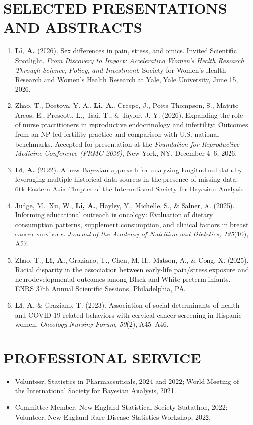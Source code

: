 \documentclass[letterpaper,11pt]{article}
\newcommand{\resumeItem}[1]{
  \item\small{
    {#1 \vspace{-1pt}}
  }
}
\newcommand{\resumeItemListStart}{\begin{itemize}[leftmargin=0.1in]}
\newcommand{\resumeItemListEnd}{\end{itemize}\vspace{-5pt}}
\newcommand{\publicationListStart}{%
  \begin{enumerate}[
    leftmargin=0.30in,
    labelsep=0.08in,
    itemsep=5pt,
    topsep=5pt,
    parsep=0pt,
    partopsep=0pt
  ]%
}
\newcommand{\publicationListEnd}{\end{enumerate}}
\newcommand{\publicationItem}[1]{\item \normalsize{#1}}
\begin{document}
\section{SELECTED PRESENTATIONS AND ABSTRACTS}
\publicationListStart
  \publicationItem{\textbf{Li, A.} (2026). Sex differences in pain, stress, and omics. Invited Scientific Spotlight, \textit{From Discovery to Impact: Accelerating Women's Health Research Through Science, Policy, and Investment}, Society for Women's Health Research and Women's Health Research at Yale, Yale University, June 15, 2026.}
  \publicationItem{Zhao, T., Dostova, Y. A., \textbf{Li, A.}, Crespo, J., Potts-Thompson, S., Matute-Arcos, E., Prescott, L., Tsai, T., \& Taylor, J. Y. (2026). Expanding the role of nurse practitioners in reproductive endocrinology and infertility: Outcomes from an NP-led fertility practice and comparison with U.S. national benchmarks. Accepted for presentation at the \textit{Foundation for Reproductive Medicine Conference (FRMC 2026)}, New York, NY, December 4--6, 2026.}
  \publicationItem{\textbf{Li, A.} (2022). A new Bayesian approach for analyzing longitudinal data by leveraging multiple historical data sources in the presence of missing data. 6th Eastern Asia Chapter of the International Society for Bayesian Analysis.}
  \publicationItem{Judge, M., Xu, W., \textbf{Li, A.}, Hayley, Y., Michelle, S., \& Salner, A. (2025). Informing educational outreach in oncology: Evaluation of dietary consumption patterns, supplement consumption, and clinical factors in breast cancer survivors. \textit{Journal of the Academy of Nutrition and Dietetics, 125}(10), A27.}
  \publicationItem{Zhao, T., \textbf{Li, A.}, Graziano, T., Chen, M. H., Matson, A., \& Cong, X. (2025). Racial disparity in the association between early-life pain/stress exposure and neurodevelopmental outcomes among Black and White preterm infants. ENRS 37th Annual Scientific Sessions, Philadelphia, PA.}
  \publicationItem{\textbf{Li, A.} \& Graziano, T. (2023). Association of social determinants of health and COVID-19-related behaviors with cervical cancer screening in Hispanic women. \textit{Oncology Nursing Forum, 50}(2), A45--A46.}
\publicationListEnd

\section{PROFESSIONAL SERVICE}
\resumeItemListStart
  \resumeItem{\normalsize{Volunteer, Statistics in Pharmaceuticals, 2024 and 2022; World Meeting of the International Society for Bayesian Analysis, 2021.}}
  \resumeItem{\normalsize{Committee Member, New England Statistical Society Statathon, 2022; Volunteer, New England Rare Disease Statistics Workshop, 2022.}}
\resumeItemListEnd
\end{document}
